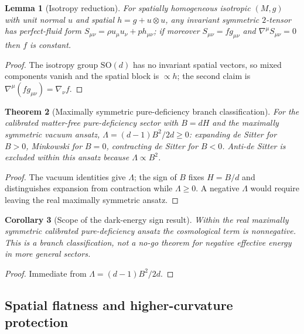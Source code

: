 \documentclass[11pt]{article}
\newtheorem{theorem}{Theorem}[section]
\newtheorem{lemma}[theorem]{Lemma}
\newtheorem{corollary}[theorem]{Corollary}
\theoremstyle{definition}
\theoremstyle{remark}
\begin{document}
\begin{lemma}[Isotropy reduction]
\label{lem:isotropy-reduction}
For spatially homogeneous isotropic $(M,g)$ with unit normal $u$ and spatial
$h=g+u\otimes u$, any invariant symmetric $2$-tensor has perfect-fluid form
$S_{\mu\nu}=\rho u_\mu u_\nu+p h_{\mu\nu}$; if moreover $S_{\mu\nu}=fg_{\mu\nu}$ and
$\nabla^\mu S_{\mu\nu}=0$ then $f$ is constant.
\end{lemma}

\begin{proof}
The isotropy group $\mathrm{SO}(d)$ has no invariant spatial vectors, so mixed
components vanish and the spatial block is $\propto h$; the second claim is
$\nabla^\mu(fg_{\mu\nu})=\nabla_\nu f$.
\end{proof}

\begin{theorem}[Maximally symmetric pure-deficiency branch classification]
\label{thm:vacuum-trichotomy}
For the calibrated matter-free pure-deficiency sector with $B=dH$ and the
maximally symmetric vacuum ansatz, $\Lambda=(d-1)B^2/2d\ge0$: expanding de Sitter
for $B>0$, Minkowski for $B=0$, contracting de Sitter for $B<0$.  Anti-de Sitter
is excluded within this ansatz because $\Lambda\propto B^2$.
\end{theorem}

\begin{proof}
The vacuum identities give $\Lambda$; the sign of $B$ fixes $H=B/d$ and
distinguishes expansion from contraction while $\Lambda\ge0$.  A negative
$\Lambda$ would require leaving the real maximally symmetric ansatz.
\end{proof}

\begin{corollary}[Scope of the dark-energy sign result]
\label{cor:sign-dark-energy}
Within the real maximally symmetric calibrated pure-deficiency ansatz the
cosmological term is nonnegative.  This is a branch classification, not a no-go
theorem for negative effective energy in more general sectors.
\end{corollary}

\begin{proof}
Immediate from $\Lambda=(d-1)B^2/2d$.
\end{proof}

\subsection{Spatial flatness and higher-curvature protection}
\label{subsec:spatial-flatness}
\end{document}
